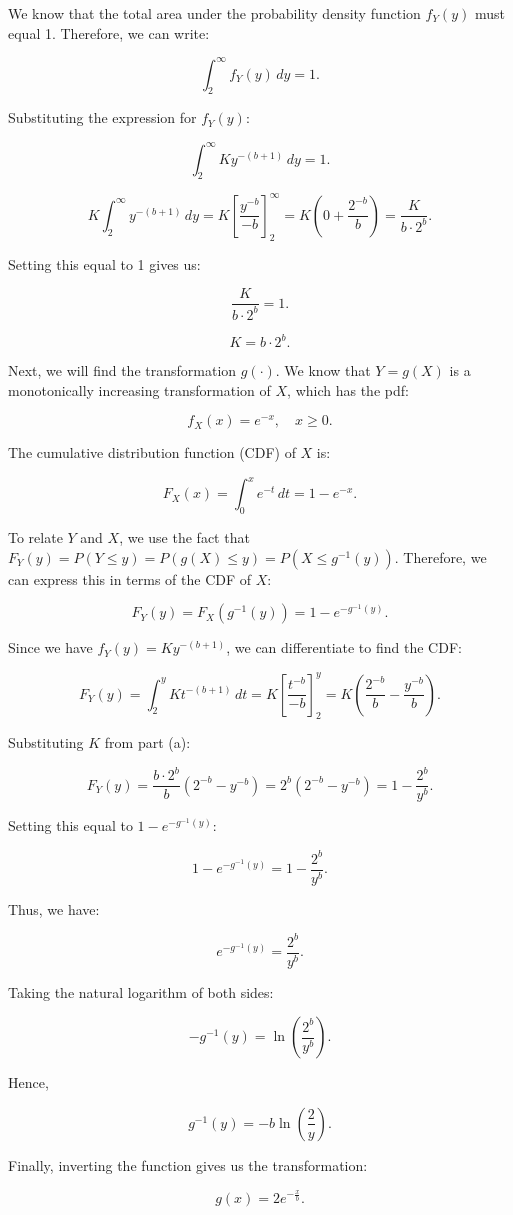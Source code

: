 \begin{solution}

We know that the total area under the probability density function \( f_Y(y) \) must equal 1. Therefore, we can write:

\[
\int_{2}^{\infty} f_Y(y) \, dy = 1.
\]

Substituting the expression for \( f_Y(y) \):

\[
\int_{2}^{\infty} K y^{-(b+1)} \, dy = 1.
\]

\[
K \int_{2}^{\infty} y^{-(b+1)} \, dy = K \left[ \frac{y^{-b}}{-b} \right]_{2}^{\infty} = K \left( 0 + \frac{2^{-b}}{b} \right) = \frac{K}{b \cdot 2^b}.
\]

Setting this equal to 1 gives us:

\[
\frac{K}{b \cdot 2^b} = 1.
\]

\[
K = b \cdot 2^b.
\]

\vspace{10pt}
Next, we will find the transformation \( g(\cdot) \). We know that \( Y = g(X) \) is a monotonically increasing transformation of \( X \), which has the pdf:

\[
f_X(x) = e^{-x}, \quad x \geq 0.
\]

The cumulative distribution function (CDF) of \( X \) is:

\[
F_X(x) = \int_{0}^{x} e^{-t} \, dt = 1 - e^{-x}.
\]

To relate \( Y \) and \( X \), we use the fact that \( F_Y(y) = P(Y \leq y) = P(g(X) \leq y) = P(X \leq g^{-1}(y)) \). Therefore, we can express this in terms of the CDF of \( X \):

\[
F_Y(y) = F_X(g^{-1}(y)) = 1 - e^{-g^{-1}(y)}.
\]

Since we have \( f_Y(y) = K y^{-(b+1)} \), we can differentiate to find the CDF:

\[
F_Y(y) = \int_{2}^{y} K t^{-(b+1)} \, dt = K \left[ \frac{t^{-b}}{-b} \right]_{2}^{y} = K \left( \frac{2^{-b}}{b} - \frac{y^{-b}}{b} \right).
\]

Substituting \( K \) from part (a):

\[
F_Y(y) = \frac{b \cdot 2^b}{b} \left( 2^{-b} - y^{-b} \right) = 2^b \left( 2^{-b} - y^{-b} \right) = 1 - \frac{2^b}{y^b}.
\]

Setting this equal to \( 1 - e^{-g^{-1}(y)} \):

\[
1 - e^{-g^{-1}(y)} = 1 - \frac{2^b}{y^b}.
\]

Thus, we have:

\[
e^{-g^{-1}(y)} = \frac{2^b}{y^b}.
\]

Taking the natural logarithm of both sides:

\[
-g^{-1}(y) = \ln\left(\frac{2^b}{y^b}\right).
\]

Hence,

\[
g^{-1}(y) = -b \ln\left(\frac{2}{y}\right).
\]

Finally, inverting the function gives us the transformation:

\[
g(x) = 2 e^{-\frac{x}{b}}.
\]
\end{solution}


